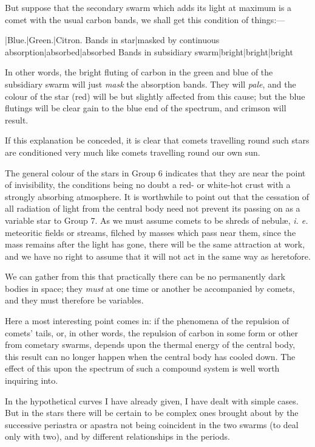 \documentclass[a4paper, 12pt, oneside, polutonikogreek, english]{article}
\begin{document}
But suppose that the secondary swarm which adds its light at maximum is a comet with the usual carbon bands, we shall get this condition of things:---

|Blue.|Green.|Citron. 
Bands in star|masked by continuous absorption|absorbed|absorbed 
Bands in subsidiary swarm|bright|bright|bright 

In other words, the bright fluting of carbon in the green and blue of the subsidiary swarm will just \emph{mask} the absorption bands. They will \emph{pale}, and the colour of the star (red) will be but slightly affected from this cause; but the blue flutings will be clear gain to the blue end of the spectrum, and crimson will result.

If this explanation be conceded, it is clear that comets travelling round such stars are conditioned very much like comets travelling round our own sun.

The general colour of the stars in Group 6 indicates that they are near the point of invisibility, the conditions being no doubt a red- or white-hot crust with a strongly absorbing atmosphere. It is worthwhile to point out that the cessation of all radiation of light from the central body need not prevent its passing on as a variable star to Group 7. As we must assume comets to be shreds of nebulæ, \emph{i. e.} meteoritic fields or streams, filched by masses which pass near them, since the mass remains after the light has gone, there will be the same attraction at work, and we have no right to assume that it will not act in the same way as heretofore.

We can gather from this that practically there can be no permanently dark bodies in space; they \emph{must} at one time or another be accompanied by comets, and they must therefore be variables.

Here a most interesting point comes in: if the phenomena of the repulsion of comets' tails, or, in other words, the repulsion of carbon in some form or other from cometary swarms, depends upon the thermal energy of the central body, this result can no longer happen when the central body has cooled down. The effect of this upon the spectrum of such a compound system is well worth inquiring into.

In the hypothetical curves I have already given, I have dealt with simple cases. But in the stars there will be certain to be complex ones brought about by the successive periastra or apastra not being coincident in the two swarms (to deal only with two), and by different relationships in the periods.
\end{document}
